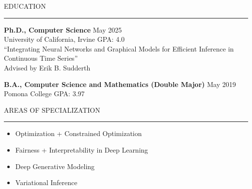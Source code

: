 \documentclass{resume} %
\renewenvironment{rSection}[1]{
\sectionskip
\textcolor{CarnegieMellonRed}{\MakeUppercase{#1}}
\sectionlineskip
\hrule
\begin{list}{}{
\setlength{\leftmargin}{1.5em}
}
\item[]
}{
\end{list}
}
\begin{document}
\vspace{2.em}
\begin{rSection}{Education}
{\bf Ph.D., Computer Science} \hfill { May 2025} 
\\ University of California, Irvine \hfill { GPA: 4.0}
\\ ``Integrating Neural Networks and Graphical Models for Efficient Inference in Continuous Time Series''
\\ Advised by Erik B. Sudderth

{\bf B.A., Computer Science and Mathematics (Double Major)} \hfill { May 2019} 
\\ Pomona College \hfill { GPA: 3.97}\vspace{1.em}
\end{rSection}

\begin{rSection}{Areas of Specialization}
\begin{multicols}{2}
\begin{itemize}
    \item Optimization + Constrained Optimization
    \item Fairness + Interpretability in Deep Learning
    \item Deep Generative Modeling
    \item Variational Inference
\end{itemize}
\end{multicols}
\end{rSection}
\end{document}
